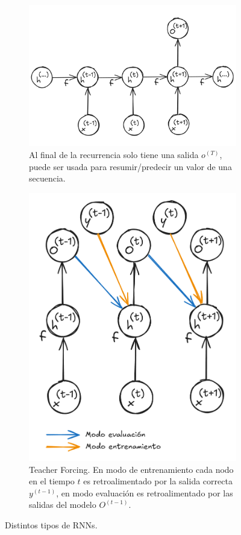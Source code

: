 \begin{figure}[!ht]
    \begin{subfigure}[b]{0.4\textwidth}
        \centering
        \includegraphics[height=0.63\textwidth]{Chapters/2. Transformer/Figures/rnn/rnn_cfgc.png}
        \caption{Al final de la recurrencia solo tiene una salida $o^{(T)}$, puede ser usada para
        resumir/predecir un valor de una secuencia.}
        \label{fig:rnn_cfgc}
    \end{subfigure}
    \hfill
    \begin{subfigure}[b]{0.49\textwidth}
        \centering
        \includegraphics[height=0.6\textwidth]{Chapters/2. Transformer/Figures/rnn/rnn_cfgd.png}
        \caption{Teacher Forcing. En modo de entrenamiento cada nodo en el tiempo $t$ es
        retroalimentado por la salida correcta $y^{(t-1)}$, en modo evaluación es retroalimentado por las
        salidas del modelo $O^{(t-1)}$.}
        \label{fig:rnn_cfgd}
    \end{subfigure}

    \caption{Distintos tipos de RNNs.}
    \label{fig:three graphs}
\end{figure}


